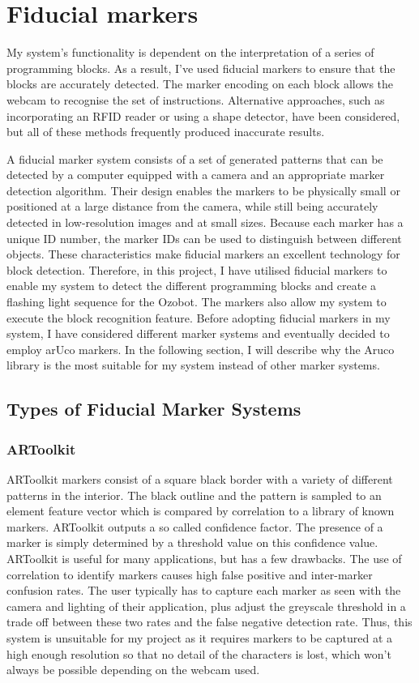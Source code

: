 \documentclass[oneside,%
                    author={Malak Hajji},
                    degree={BSc},
                    title={Designing An Accessible Ozobot Programming Platform for Students},
                  subtitle={With Mixed Visual Abilities}]{dissertation}
\begin{document}
\section{Fiducial markers}
\noindent
My system's functionality is dependent on the interpretation of a series of programming blocks. As a result, I've used fiducial markers to ensure that the blocks are accurately detected. The  marker encoding on each block allows the webcam to recognise the set of instructions. 
Alternative approaches, such as incorporating an RFID reader or using a shape detector, have been considered, but all of these methods frequently produced inaccurate results.

A fiducial marker system consists of a set of generated patterns that can be detected by a computer equipped with a camera and an appropriate marker detection algorithm. Their design enables the markers to be physically small or positioned at a large distance from the camera, while still being accurately detected in low-resolution images and at small sizes. Because each marker has a unique ID number, the marker IDs can be used to distinguish between different objects. These characteristics make fiducial markers an excellent technology for block detection. 
Therefore, in this project, I have utilised fiducial markers to enable my system to detect the different programming blocks and create a flashing light sequence for the Ozobot. The markers also allow my system to execute the block recognition feature.  Before adopting fiducial markers in my system, I have considered different marker systems and eventually decided to employ arUco markers. In the following section, I will describe why the Aruco library is the most suitable for my system instead of other marker systems.

\subsection{Types of Fiducial Marker Systems}

\subsubsection{ARToolkit}

ARToolkit\cite{artoolkit} markers consist of a square black border with a variety of different patterns in the interior. The black outline and the pattern is sampled to an element feature vector which is compared by correlation to a library of known markers. ARToolkit outputs a so called confidence factor. The presence of a marker is simply determined by a threshold value on this confidence value.
ARToolkit is useful for many applications, but has a few drawbacks. The use of correlation to identify markers causes high false positive and inter-marker confusion rates. The user typically has to capture each marker as seen with the camera and lighting of their application, plus adjust the greyscale threshold in a trade off between these two rates and the false negative detection rate. Thus, this system is unsuitable for my project as it requires markers to be captured at a high enough resolution so that no detail of the characters is lost, which won't always be possible depending on the webcam used.
\end{document}
